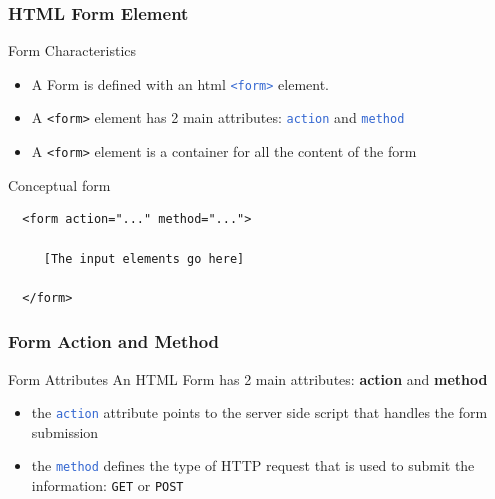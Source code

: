 \documentclass{beamer}\usepackage[]{graphicx}\usepackage[]{color}
\newcommand{\code}[1]{\texttt{#1}}
\newcommand{\highcode}[1]{\textcolor{highlight}{\texttt{#1}}}
\begin{document}
\begin{frame}[fragile]
\frametitle{HTML Form Element}

\begin{block}{Form Characteristics}
\begin{itemize}
 \item A Form is defined with an html \highcode{<form>} element. 
 \item A \code{<form>} element has 2 main attributes: \highcode{action} and \highcode{method}
 \item A \code{<form>} element is a container for all the content of the form
\end{itemize}
\end{block}

\begin{block}{Conceptual form}
\begin{verbatim}
  <form action="..." method="...">

     [The input elements go here]

  </form>
\end{verbatim}
\end{block}

\end{frame}


\begin{frame}
\frametitle{Form Action and Method}

\begin{block}{Form Attributes}
An HTML Form has 2 main attributes: \textbf{action} and \textbf{method}
\begin{itemize}
 \item the \highcode{action} attribute points to the server side script that handles the form submission
 \item the \highcode{method} defines the type of HTTP request that is used to submit the information: \code{GET} or \code{POST} 
\end{itemize}
\end{block}

\end{frame}

\end{document}
